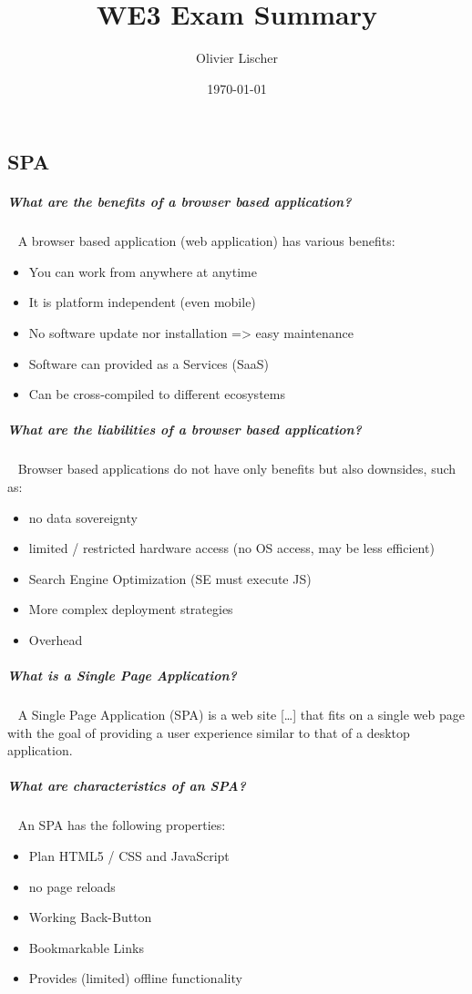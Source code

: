 \documentclass[11pt,twoside,landscape]{article}
\author{Olivier Lischer}
\date{\today}
\title{WE3 Exam Summary}
\begin{document}
\pagestyle{fancy}
\fancyhf{}
\fancyfoot[CE,CO]{\leftmark}
\fancyfoot[R]{\thepage}

\begin{multicols}{4}
\section{SPA}
\label{sec:org47a5a14}
\subparagraph{What are the benefits of a browser based application?} \
\label{sec:org7580a9d}
A browser based application (web application) has various benefits:
\begin{itemize}
\item You can work from anywhere at anytime
\item It is platform independent (even mobile)
\item No software update nor installation => easy maintenance
\item Software can provided as a Services (SaaS)
\item Can be cross-compiled to different ecosystems
\end{itemize}
\subparagraph{What are the liabilities of a browser based application?} \
\label{sec:org2060ee8}
Browser based applications do not have only benefits but also downsides, such as:
\begin{itemize}
\item no data sovereignty
\item limited / restricted hardware access (no OS access, may be less efficient)
\item Search Engine Optimization (SE must execute JS)
\item More complex deployment strategies
\item Overhead
\end{itemize}
\subparagraph{What is a Single Page Application?} \
\label{sec:orgb881032}
A Single Page Application (SPA) is a web site [\ldots{}] that fits on a single web page with the goal of providing a user experience similar to that of a desktop application.
\subparagraph{What are characteristics of an SPA?} \
\label{sec:orga317902}
An SPA has the following properties:
\begin{itemize}
\item Plan HTML5 / CSS and JavaScript
\item no page reloads
\item Working Back-Button
\item Bookmarkable Links
\item Provides (limited) offline functionality

\end{itemize}
\end{multicols}
\end{document}
